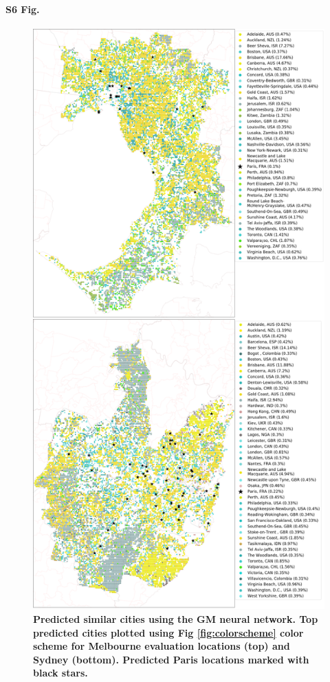 \documentclass[10pt,letterpaper,hidelinks]{article}
\begin{document}
\paragraph*{S6 Fig.}
\begin{figure}[!htbp]
\centering   
\includegraphics[scale=0.33]{Images/PlosOne/Fig6.png}  
\caption{\bf Predicted similar cities using the GM neural network. Top predicted cities plotted using Fig \ref{fig:colorscheme} color scheme for Melbourne evaluation locations (top) and Sydney (bottom). Predicted Paris locations marked with black stars.}    
 \label{fig:melmaps}  
\end{figure} 
\end{document}
